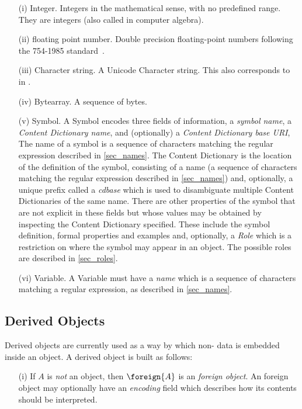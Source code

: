 \begin{itemize}
\item[(i)] Integer.  Integers in the mathematical sense, with no predefined range.  They
  are  integers (also called  in computer
  algebra).
\item[(ii)]  floating point number.  Double precision floating-point numbers
  following the  754-1985 standard~\cite{ieee754_85}.
\item[(iii)] Character string.  A Unicode Character string. This also corresponds to
   in \XML.
\item[(iv)] Bytearray.  A sequence of bytes.
\item[(v)] Symbol.  A Symbol encodes three fields of information, a \emph{symbol name}, a
  \emph{Content Dictionary name}, and (optionally) a \emph{Content Dictionary base URI},
  The name of a symbol is a sequence of characters matching the regular expression
  described in \ref{sec_names}.  The Content Dictionary is the location of the definition
  of the symbol, consisting of a name (a sequence of characters matching the regular
  expression described in \ref{sec_names}) and, optionally, a unique prefix called a
  \emph{cdbase} which is used to disambiguate multiple Content Dictionaries of the same
  name.  There are other properties of the symbol that are not explicit in these fields
  but whose values may be obtained by inspecting the Content Dictionary specified. These
  include the symbol definition, formal properties and examples and, optionally, a
  \emph{Role} which is a restriction on where the symbol may appear in an \OM object.  The
  possible roles are described in \ref{sec_roles}.
\item[(vi)] Variable.  A Variable must have a \emph{name} which is a sequence of
  characters matching a regular expression, as described in \ref{sec_names}.
\end{itemize}


\subsection{Derived \OM Objects}\label{sec_derived}

Derived \OM objects are currently used as a way by which non-\OM
data is embedded inside an \OM object.
A derived \OM object is built as follows: 
\begin{itemize}
\item[(i)] If $A$ is \emph{not} an \OM object, then $\foreign{A}$ is an \OM
  \emph{foreign object}.  An \OM foreign object may optionally have an \emph{encoding}
  field which describes how its contents should be interpreted.
\end{itemize}




